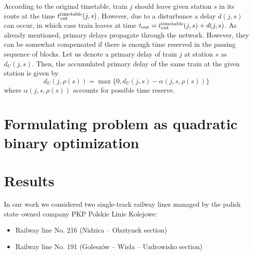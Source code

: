 According to the original timetable, train $j$ should leave given station $s$ in its route at the time $t_\text{out}^\text{timetable}(j, s)$. However, due to a disturbance a delay $d(j, s)$ can occur, in which case train
leaves at time $t_\text{out} = t_\text{out}^\text{timetable}(j, s) + d(j, s)$. As already mentioned, primary delays propagate
through the network. However, they can be somewhat compensated if there is enough time reserved
in the passing sequence of blocks. Let us denote a primary delay of train $j$ at station $s$ as
$d_U(j, s)$. Then, the accumulated primary delay of the same train at the given station is
given by
\begin{equation}
    d_U(j, \rho(s)) = \max\{0, d_U(j, s) - \alpha(j, s, \rho(s))\}
\end{equation}
where $\alpha(j, s, \rho(s))$ accounts for possible time reserve.
\section{Formulating problem as quadratic binary optimization}


\section{Results}
In our work we considered two single-track railway lines managed by the polish state--owned company
PKP Polskie Linie Kolejowe:

\begin{itemize}
    \item Railway line No. 216 (Nidzica -- Olsztynek section)
    \item Railway line No. 191 (Goleszów -- Wisła -- Uzdrowisko section)
\end{itemize}
